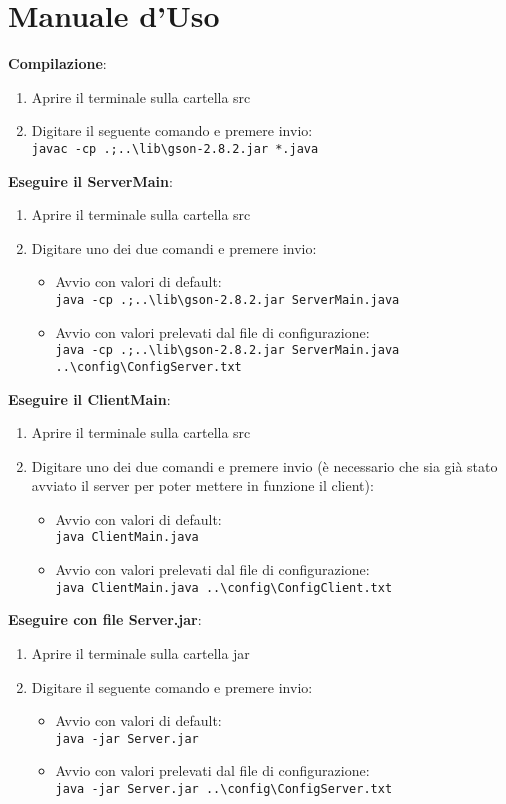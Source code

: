 \documentclass[11pt, a4paper, oneside]{article}
\begin{document}
\section{Manuale d'Uso}
\textbf{Compilazione}:
\begin{enumerate}
    \item Aprire il terminale sulla cartella src
    \item Digitare il seguente comando e premere invio:\\ \texttt{javac -cp .;..\textbackslash lib\textbackslash gson-2.8.2.jar *.java}
\end{enumerate}
\textbf{Eseguire il ServerMain}:
\begin{enumerate}
    \item Aprire il terminale sulla cartella src
    \item Digitare uno dei due comandi e premere invio:
    \begin{itemize}
        \item Avvio con valori di default:\\ \texttt{java -cp .;..\textbackslash lib\textbackslash gson-2.8.2.jar ServerMain.java}
        \item Avvio con valori prelevati dal file di configurazione:\\ \texttt{java -cp .;..\textbackslash lib\textbackslash gson-2.8.2.jar ServerMain.java ..\textbackslash config\textbackslash ConfigServer.txt}
    \end{itemize}
\end{enumerate}
\textbf{Eseguire il ClientMain}:
\begin{enumerate}
    \item Aprire il terminale sulla cartella src
    \item Digitare uno dei due comandi e premere invio (è necessario che sia già stato avviato il server per poter mettere in funzione il client):
    \begin{itemize}
        \item Avvio con valori di default:\\ \texttt{java ClientMain.java}
        \item Avvio con valori prelevati dal file di configurazione:\\ \texttt{java ClientMain.java ..\textbackslash config\textbackslash ConfigClient.txt}
    \end{itemize}
\end{enumerate}
\textbf{Eseguire con file Server.jar}:
\begin{enumerate}
    \item Aprire il terminale sulla cartella jar
    \item Digitare il seguente comando e premere invio:
    \begin{itemize}
        \item Avvio con valori di default:\\
        \texttt{java -jar Server.jar}
        \item Avvio con valori prelevati dal file di configurazione:\\
        \texttt{java -jar Server.jar ..\textbackslash config\textbackslash ConfigServer.txt}
    \end{itemize}
\end{enumerate}
\end{document}
